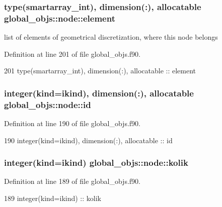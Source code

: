 \subsubsection[{element}]{\setlength{\rightskip}{0pt plus 5cm}type({\bf smartarray\+\_\+int}), dimension(\+:), allocatable global\+\_\+objs\+::node\+::element}\label{structglobal__objs_1_1node_a7371f7895a20d51177574da103d54b01}


list of elements of geometrical discretization, where this node belongs 



Definition at line 201 of file global\+\_\+objs.\+f90.


\begin{DoxyCode}
201     \textcolor{keywordtype}{type}(smartarray_int), \textcolor{keywordtype}{dimension(:)}, \textcolor{keywordtype}{allocatable} :: element
\end{DoxyCode}
\subsubsection[{id}]{\setlength{\rightskip}{0pt plus 5cm}integer(kind=ikind), dimension(\+:), allocatable global\+\_\+objs\+::node\+::id}\label{structglobal__objs_1_1node_ae8fd762bd83836d135b6304d1678f582}


Definition at line 190 of file global\+\_\+objs.\+f90.


\begin{DoxyCode}
190     \textcolor{keywordtype}{integer(kind=ikind)}, \textcolor{keywordtype}{dimension(:)}, \textcolor{keywordtype}{allocatable} :: id
\end{DoxyCode}
\subsubsection[{kolik}]{\setlength{\rightskip}{0pt plus 5cm}integer(kind=ikind) global\+\_\+objs\+::node\+::kolik}\label{structglobal__objs_1_1node_a31d502a06911ea13edf15478d5d7903f}


Definition at line 189 of file global\+\_\+objs.\+f90.


\begin{DoxyCode}
189     \textcolor{keywordtype}{integer(kind=ikind)} ::  kolik
\end{DoxyCode}
